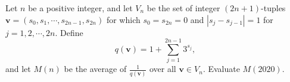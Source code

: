 Let $n$ be a positive integer, and let $V_n$ be the set of integer $(2n+1)$-tuples $\mathbf{v}=(s_0,s_1,\cdots,s_{2n-1},s_{2n})$ for which $s_0=s_{2n}=0$ and $|s_j-s_{j-1}|=1$ for $j=1,2,\cdots,2n$. Define
\[
q(\mathbf{v})=1+\sum_{j=1}^{2n-1}3^{s_j},
\]and let $M(n)$ be the average of $\frac{1}{q(\mathbf{v})}$ over all $\mathbf{v}\in V_n$. Evaluate $M(2020)$.